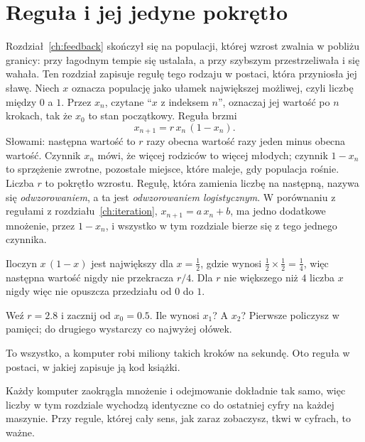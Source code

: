 \section{Reguła i jej jedyne pokrętło}
\label{sec:ch05-rule}

\noindent
Rozdział~\ref{ch:feedback} skończył się na populacji, której wzrost zwalnia
w pobliżu granicy: przy łagodnym tempie się ustalała, a przy szybszym
przestrzeliwała i się wahała. Ten rozdział zapisuje regułę tego rodzaju w
postaci, która przyniosła jej sławę. Niech $x$ oznacza populację jako ułamek
największej możliwej, czyli liczbę między $0$ a $1$. Przez $x_n$, czytane
\enquote{$x$ z indeksem $n$}, oznaczaj jej wartość po $n$ krokach, tak że
$x_0$ to stan początkowy. Reguła brzmi
\[ x_{n+1} = r\, x_n\, (1 - x_n). \]
Słowami: następna wartość to $r$ razy obecna wartość razy jeden minus
obecna wartość. Czynnik $x_n$ mówi, że więcej rodziców to więcej młodych;
czynnik $1 - x_n$ to sprzężenie zwrotne, pozostałe miejsce, które maleje,
gdy populacja rośnie. Liczba $r$ to pokrętło wzrostu. Regułę, która
zamienia liczbę na następną, nazywa się \emph{odwzorowaniem}, a ta jest
\emph{odwzorowaniem logistycznym}. W porównaniu z regułami z
rozdziału~\ref{ch:iteration}, $x_{n+1} = a\,x_n + b$, ma jedno dodatkowe
mnożenie, przez $1 - x_n$, i wszystko w tym rozdziale bierze się z tego
jednego czynnika.

Iloczyn $x\,(1 - x)$ jest największy dla $x = \tfrac12$, gdzie wynosi
$\tfrac12 \times \tfrac12 = \tfrac14$, więc następna wartość nigdy nie
przekracza $r/4$. Dla $r$ nie większego niż $4$ liczba $x$ nigdy więc nie
opuszcza przedziału od $0$ do $1$.

\begin{think}
Weź $r = \num{2.8}$ i zacznij od $x_0 = \num{0.5}$. Ile wynosi $x_1$? A
$x_2$? Pierwsze policzysz w pamięci; do drugiego wystarczy co najwyżej
ołówek.
\end{think}

\noindent
To wszystko, a komputer robi miliony takich kroków na sekundę. Oto reguła w
postaci, w jakiej zapisuje ją kod książki.


\noindent
Każdy komputer zaokrągla mnożenie i odejmowanie dokładnie tak samo, więc
liczby w tym rozdziale wychodzą identyczne co do ostatniej cyfry na każdej
maszynie. Przy regule, której cały sens, jak zaraz zobaczysz, tkwi w
cyfrach, to ważne.

